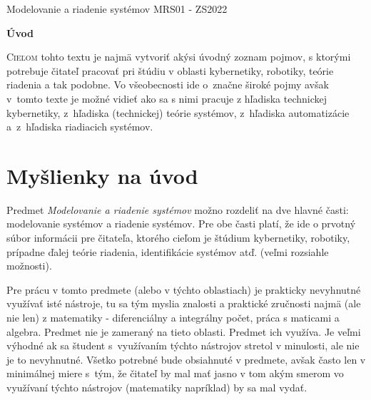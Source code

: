 \documentclass[a4paper, 10pt, ]{article}
\def\oznacenieCasti{MRS01 - ZS2022}
\begin{document}
\lstset{%
style=mystyle,
rangebeginprefix=\#\#\#\ cellB\ ,%
rangebeginsuffix=\ \#\#\#,%
rangeendprefix=\#\#\#\ cellE\ ,%
rangeendsuffix=\ \#\#\#,%
includerangemarker=false,
}




\fontsize{12pt}{22pt}\selectfont

\centerline{\textsf{Modelovanie a riadenie systémov} \hfill \textsf{\oznacenieCasti}}

\fontsize{18pt}{22pt}\selectfont





\begin{flushleft}
	\textbf{\textsf{Úvod}}
\end{flushleft}





\normalsize

\bigskip

{\hypersetup{hidelinks}

\tableofcontents

}

\bigskip

\vspace{18pt}



\noindent
\lettrine[lines=3, nindent=0pt]{C}{ieľom} tohto textu je najmä vytvoriť akýsi úvodný zoznam pojmov, s ktorými potrebuje čitateľ pracovať pri štúdiu v oblasti kybernetiky, robotiky, teórie riadenia a tak podobne. Vo všeobecnosti ide o~značne široké pojmy avšak v~tomto texte je možné vidieť ako sa s nimi pracuje z hľadiska technickej kybernetiky, z~hľadiska (technickej) teórie systémov, z~hľadiska automatizácie a~z~hľadiska riadiacich systémov.






\section{Myšlienky na úvod}

Predmet \emph{Modelovanie a riadenie systémov} možno rozdeliť na dve hlavné časti: modelovanie systémov a riadenie systémov. Pre obe časti platí, že ide o prvotný súbor informácii pre čitateľa, ktorého cieľom je štúdium kybernetiky, robotiky, prípadne ďalej teórie riadenia, identifikácie systémov atď. (veľmi rozsiahle možnosti).

Pre prácu v tomto predmete (alebo v týchto oblastiach) je prakticky nevyhnutné využívať isté nástroje, tu sa tým myslia znalosti a praktické zručnosti najmä (ale nie len) z matematiky - diferenciálny a integrálny počet, práca s maticami a algebra. Predmet nie je zameraný na tieto oblasti. Predmet ich využíva. Je veľmi výhodné ak sa študent s~využívaním týchto nástrojov stretol v minulosti, ale nie je to nevyhnutné. Všetko potrebné bude obsiahnuté v predmete, avšak často len v minimálnej miere s~tým, že čitateľ by mal mať jasno v tom akým smerom vo využívaní týchto nástrojov (matematiky napríklad) by sa mal vydať.
\end{document}
